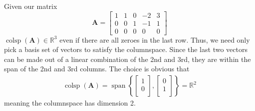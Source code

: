 \documentclass[]{article}
\numberwithin{equation}{section}
\begin{document}
Given our matrix 
\begin{equation}
	\mathbf{A} = 
	\begin{bmatrix}
	1 & 1 & 0 & -2 & 3 \\
	0 & 0 & 1 & -1 & 1 \\
	0 & 0 & 0 & 0 & 0
	\end{bmatrix}
\end{equation}
\(\operatorname{colsp}(\mathbf{A}) \in \mathbb{R}^3\) even if there are all zeroes in the last row. Thus, we need only pick a basis set of vectors to satisfy the columnspace. Since the last two vectors can be made out of a linear combination of the 2nd and 3rd, they are within the span of the 2nd and 3rd columns. The choice is obvious that
\begin{gather}
	\operatorname{colsp}(\mathbf{A}) = \operatorname{span}\left\lbrace\begin{bmatrix}
	1 \\
	0 \\
	\end{bmatrix},\begin{bmatrix}
	0 \\
	1 \\
	\end{bmatrix}\right\rbrace = \mathbb{R}^2
\end{gather}
meaning the columnspace has dimension 2. 

\subsection{}
\end{document}
